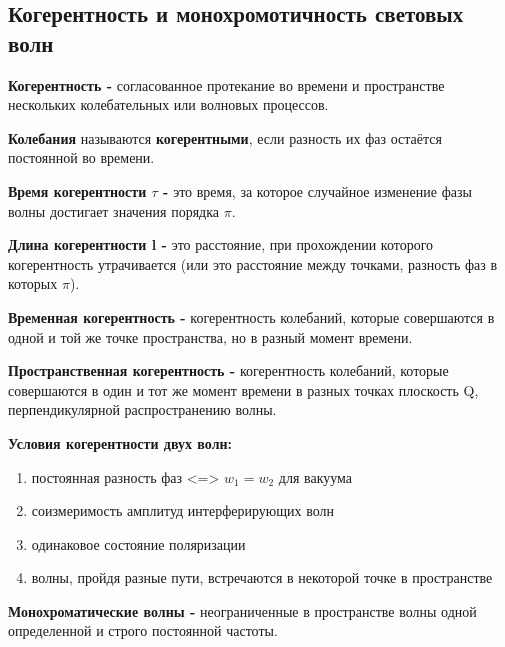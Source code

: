\documentclass[12pt]{report}
\begin{document}
\subsection{Когерентность и монохромотичность световых волн}
\textbf{Когерентность - } согласованное протекание во времени и пространстве нескольких колебательных или волновых процессов.\par
\textbf{Колебания} называются \textbf{когерентными}, если разность их фаз остаётся постоянной во времени.\par
\textbf{Время когерентности $\tau$ - } это время, за которое случайное изменение фазы волны достигает значения порядка $\pi$.\par
\textbf{Длина когерентности l - } это расстояние, при прохождении которого когерентность утрачивается (или это расстояние между точками, разность фаз в которых $\pi$).\par
\textbf{Временная когерентность - } когерентность колебаний, которые совершаются в одной и той же точке пространства, но в разный момент времени.\par
\textbf{Пространственная когерентность - } когерентность колебаний, которые совершаются в один и тот же момент времени в разных точках плоскость Q, перпендикулярной распространению волны.\par
\textbf{Условия когерентности двух волн:}
\begin{enumerate}
    \item постоянная разность фаз <=> $w_{1} = w_{2}$ для вакуума
    \item соизмеримость амплитуд интерферирующих волн
    \item одинаковое состояние поляризации
    \item волны, пройдя разные пути, встречаются в некоторой точке в пространстве
\end{enumerate}
\textbf{Монохроматические волны -} неограниченные в пространстве волны одной определенной и строго постоянной частоты.\par
\end{document}
